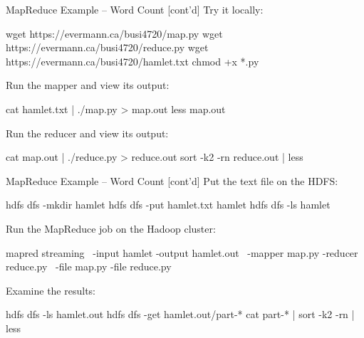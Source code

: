 \documentclass[ignorenonframetext,xcolor=x11names]{beamer}
\begin{document}
\begin{frame}[fragile]{MapReduce Example -- Word Count \small [cont'd]}
Try it locally:
\begin{bashcode}
wget https://evermann.ca/busi4720/map.py
wget https://evermann.ca/busi4720/reduce.py
wget https://evermann.ca/busi4720/hamlet.txt
chmod +x *.py
\end{bashcode}
Run the mapper and view its output:
\begin{bashcode}
cat hamlet.txt | ./map.py > map.out
less map.out
\end{bashcode}
Run the reducer and view its output:
\begin{bashcode}
cat map.out | ./reduce.py > reduce.out
sort -k2 -rn reduce.out | less
\end{bashcode}
\end{frame}

\begin{frame}[fragile]{MapReduce Example -- Word Count \small [cont'd]}
Put the text file on the HDFS:
\begin{bashcode}
hdfs dfs -mkdir hamlet
hdfs dfs -put hamlet.txt hamlet
hdfs dfs -ls hamlet
\end{bashcode}
Run the MapReduce job on the Hadoop cluster:
\begin{bashcode}
mapred streaming \
  -input hamlet -output hamlet.out \
  -mapper map.py -reducer reduce.py \
  -file map.py -file reduce.py
\end{bashcode}
Examine the results:
\begin{bashcode}
hdfs dfs -ls hamlet.out
hdfs dfs -get hamlet.out/part-*
cat part-* | sort -k2 -rn | less
\end{bashcode}
\end{frame}
\end{document}
